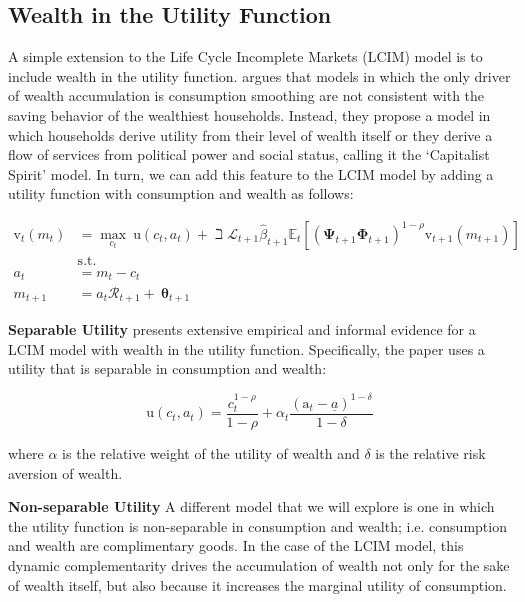 \documentclass{article}
\newcommand{\DiscFac}{\beta}
\newcommand{\uFunc}{\mathrm{u}}
\newcommand{\vFunc}{\mathrm{v}}
\newcommand{\Alive}{\mathcal{L}}
\newcommand{\Ex}{\mathbb{E}}
\newcommand{\CRRA}{\rho}
\newcommand{\PermGroFac}{\pmb{\Phi}}
\newcommand{\PermShk}{\mathbf{\Psi}}
\newcommand{\aNrm}{a}
\newcommand{\cNrm}{c}
\newcommand{\RNrm}{\mathcal{R}}
\newcommand{\TranShkEmp}{\pmb{\theta}}
\newcommand{\aFunc}{\mathrm{a}}
\newcommand{\kapShare}{\alpha}
\newcommand{\wealthShare}{\delta}
\begin{document}
\subsection{Wealth in the Utility Function}\label{Wealth in the Utility Function}

A simple extension to the Life Cycle Incomplete Markets (LCIM) model is to include wealth in the utility function. \cite{Carroll_1998} argues that models in which the only driver of wealth accumulation is consumption smoothing are not consistent with the saving behavior of the wealthiest households. Instead, they propose a model in which households derive utility from their level of wealth itself or they derive a flow of services from political power and social status, calling it the `Capitalist Spirit' model. In turn, we can add this feature to the LCIM model by adding a utility function with consumption and wealth as follows:

\begin{equation}
\begin{align}
    {\vFunc}_{t}({m}_{t}) & = \max_{\cNrm_{t}} ~ \uFunc(\cNrm_{t}, \aNrm_{t})+\beth\Alive_{t+1}\hat{\DiscFac}_{t+1}
    \Ex_{t}[(\PermShk_{t+1}\PermGroFac_{t+1})^{1-\CRRA}{\vFunc}_{t+1}({m}_{t+1})]
    \\ & \text{s.t.} & 
    \\ \aNrm_{t} & = {m}_{t}-\cNrm_{t} 
    \\ {m}_{t+1} & = \aNrm_{t}\RNrm_{t+1}+ ~\TranShkEmp_{t+1}
\end{align}
\end{equation}

\textbf{Separable Utility} \cite{Carroll_1998} presents extensive empirical and informal evidence for a LCIM model with wealth in the utility function. Specifically, the paper uses a utility that is separable in consumption and wealth:

\begin{equation}
\uFunc(\cNrm_{t}, \aNrm_{t}) = \frac{\cNrm_{t}^{1-\CRRA}}{1-\CRRA}
    + \kapShare_{t} \frac{(\aFunc_{t} - \underline\aNrm)^{1-\wealthShare}}{1-\wealthShare}
\end{equation}

where $\kapShare$ is the relative weight of the utility of wealth and $\wealthShare$ is the relative risk aversion of wealth.

\textbf{Non-separable Utility} A different model that we will explore is one in which the utility function is non-separable in consumption and wealth; i.e. consumption and wealth are complimentary goods. In the case of the LCIM model, this dynamic complementarity drives the accumulation of wealth not only for the sake of wealth itself, but also because it increases the marginal utility of consumption.
\end{document}
